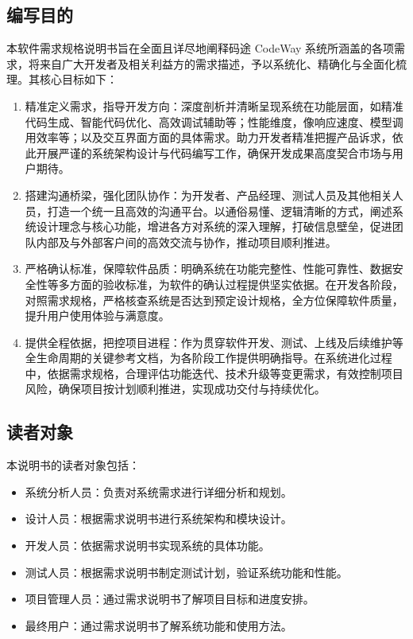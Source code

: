 \documentclass[
    report,     %
    oneside,    %
    UTF8,       %
    zihao=-4    %
]{config} %
\begin{document}
\subsection{编写目的}
本软件需求规格说明书旨在全面且详尽地阐释码途 CodeWay 系统所涵盖的各项需求，将来自广大开发者及相关利益方的需求描述，予以系统化、精确化与全面化梳理。其核心目标如下：
\begin{enumerate}[label=(\arabic*)]
\item 精准定义需求，指导开发方向：深度剖析并清晰呈现系统在功能层面，如精准代码生成、智能代码优化、高效调试辅助等；性能维度，像响应速度、模型调用效率等；以及交互界面方面的具体需求。助力开发者精准把握产品诉求，依此开展严谨的系统架构设计与代码编写工作，确保开发成果高度契合市场与用户期待。
\item 搭建沟通桥梁，强化团队协作：为开发者、产品经理、测试人员及其他相关人员，打造一个统一且高效的沟通平台。以通俗易懂、逻辑清晰的方式，阐述系统设计理念与核心功能，增进各方对系统的深入理解，打破信息壁垒，促进团队内部及与外部客户间的高效交流与协作，推动项目顺利推进。
\item 严格确认标准，保障软件品质：明确系统在功能完整性、性能可靠性、数据安全性等多方面的验收标准，为软件的确认过程提供坚实依据。在开发各阶段，对照需求规格，严格核查系统是否达到预定设计规格，全方位保障软件质量，提升用户使用体验与满意度。
\item 提供全程依据，把控项目进程：作为贯穿软件开发、测试、上线及后续维护等全生命周期的关键参考文档，为各阶段工作提供明确指导。在系统进化过程中，依据需求规格，合理评估功能迭代、技术升级等变更需求，有效控制项目风险，确保项目按计划顺利推进，实现成功交付与持续优化。
\end{enumerate}

\subsection{读者对象}
本说明书的读者对象包括：
\begin{itemize}
    \item 系统分析人员：负责对系统需求进行详细分析和规划。
    \item 设计人员：根据需求说明书进行系统架构和模块设计。
    \item 开发人员：依据需求说明书实现系统的具体功能。
    \item 测试人员：根据需求说明书制定测试计划，验证系统功能和性能。
    \item 项目管理人员：通过需求说明书了解项目目标和进度安排。
    \item 最终用户：通过需求说明书了解系统功能和使用方法。
\end{itemize}
\end{document}
